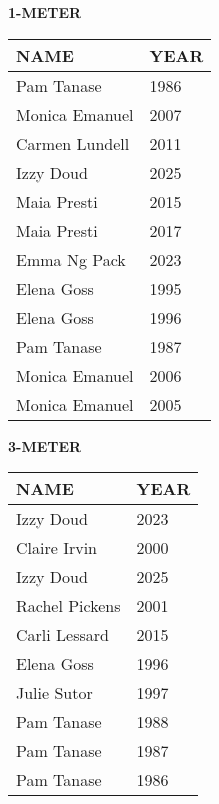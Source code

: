 \vspace{0.4cm}

\begin{center}
\begin{minipage}[t]{0.7\textwidth}
\centering
\textbf{1-METER}\\[0.05cm]
\begin{tabular}{@{}p{2.8cm}p{1.2cm}@{}}
\hline
\textbf{NAME} & \textbf{YEAR} \\
\hline
Pam Tanase & 1986 \\
Monica Emanuel & 2007 \\
Carmen Lundell & 2011 \\
Izzy Doud & 2025 \\
Maia Presti & 2015 \\
Maia Presti & 2017 \\
Emma Ng Pack & 2023 \\
Elena Goss & 1995 \\
Elena Goss & 1996 \\
Pam Tanase & 1987 \\
Monica Emanuel & 2006 \\
Monica Emanuel & 2005 \\
\hline
\end{tabular}
\end{minipage}
\end{center}

\vspace{0.4cm}

\begin{center}
\begin{minipage}[t]{0.7\textwidth}
\centering
\textbf{3-METER}\\[0.05cm]
\begin{tabular}{@{}p{2.8cm}p{1.2cm}@{}}
\hline
\textbf{NAME} & \textbf{YEAR} \\
\hline
Izzy Doud & 2023 \\
Claire Irvin & 2000 \\
Izzy Doud & 2025 \\
Rachel Pickens & 2001 \\
Carli Lessard & 2015 \\
Elena Goss & 1996 \\
Julie Sutor & 1997 \\
Pam Tanase & 1988 \\
Pam Tanase & 1987 \\
Pam Tanase & 1986 \\
\hline
\end{tabular}
\end{minipage}
\end{center}

